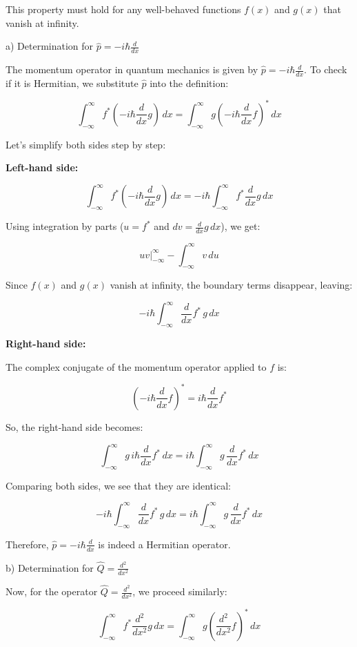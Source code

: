 \documentclass[a4paper,11pt]{article}
\begin{document}
This property must hold for any well-behaved functions \(f(x)\) and \(g(x)\) that vanish at infinity.

a) Determination for \( \hat{p} = -i\hbar\frac{d}{dx} \)

The momentum operator in quantum mechanics is given by \( \hat{p} = -i\hbar\frac{d}{dx} \). To check if it is Hermitian, we substitute \(\hat{p}\) into the definition:

\[ \int_{-\infty}^{\infty} f^{*}(-i\hbar\frac{d}{dx}g) \, dx = \int_{-\infty}^{\infty} g(-i\hbar\frac{d}{dx}f)^{*} \, dx \]

Let's simplify both sides step by step:

\textbf{Left-hand side:}

\[ \int_{-\infty}^{\infty} f^{*}(-i\hbar\frac{d}{dx}g) \, dx = -i\hbar \int_{-\infty}^{\infty} f^{*}\frac{d}{dx}g \, dx \]

Using integration by parts (\( u = f^{*} \) and \( dv = \frac{d}{dx}g \, dx \)), we get:

\[ uv \Big|_{-\infty}^{\infty} - \int_{-\infty}^{\infty} v \, du \]

Since \(f(x)\) and \(g(x)\) vanish at infinity, the boundary terms disappear, leaving:

\[ -i\hbar \int_{-\infty}^{\infty} \frac{d}{dx}f^{*} \, g \, dx \]

\textbf{Right-hand side:}

The complex conjugate of the momentum operator applied to \(f\) is:

\[ \left( -i\hbar\frac{d}{dx}f \right)^{*} = i\hbar\frac{d}{dx}f^{*} \]

So, the right-hand side becomes:

\[ \int_{-\infty}^{\infty} g \, i\hbar\frac{d}{dx}f^{*} \, dx = i\hbar \int_{-\infty}^{\infty} g \, \frac{d}{dx}f^{*} \, dx \]

Comparing both sides, we see that they are identical:

\[ -i\hbar \int_{-\infty}^{\infty} \frac{d}{dx}f^{*} \, g \, dx = i\hbar \int_{-\infty}^{\infty} g \, \frac{d}{dx}f^{*} \, dx \]

Therefore, \( \hat{p} = -i\hbar\frac{d}{dx} \) is indeed a Hermitian operator.

b) Determination for \( \hat{Q} = \frac{d^{2}}{dx^{2}} \)

Now, for the operator \( \hat{Q} = \frac{d^{2}}{dx^{2}} \), we proceed similarly:

\[ \int_{-\infty}^{\infty} f^{*}\frac{d^{2}}{dx^{2}}g \, dx = \int_{-\infty}^{\infty} g\left(\frac{d^{2}}{dx^{2}}f\right)^{*} \, dx \]
\end{document}
